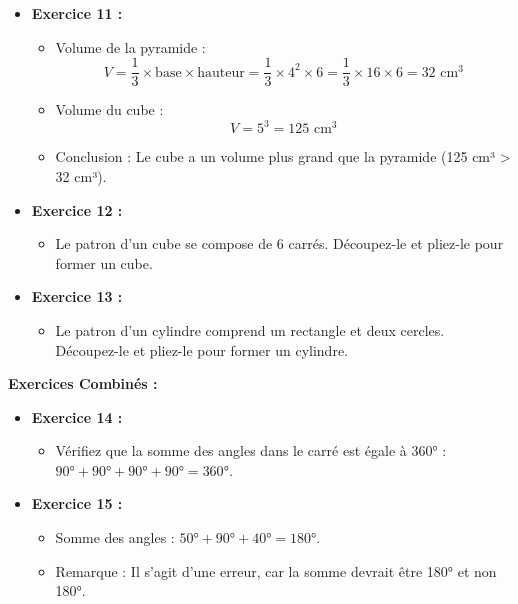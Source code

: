 \documentclass{article}
\begin{document}
\begin{tcolorbox}[colback=green!10!white, colframe=green!75!black, title=\textcolor{white}{Corrections }, sharp corners=south]

    \begin{itemize}
        \item \textbf{Exercice 11 :} 
            \begin{itemize}
                \item Volume de la pyramide : 
                    \[
                    V = \frac{1}{3} \times \text{base} \times \text{hauteur} = \frac{1}{3} \times 4^2 \times 6 = \frac{1}{3} \times 16 \times 6 = 32 \text{ cm}^3
                    \]
                \item Volume du cube : 
                    \[
                    V = 5^3 = 125 \text{ cm}^3
                    \]
                \item Conclusion : Le cube a un volume plus grand que la pyramide (125 cm³ > 32 cm³).
            \end{itemize}

        \item \textbf{Exercice 12 :} 
            \begin{itemize}
                \item Le patron d'un cube se compose de 6 carrés. Découpez-le et pliez-le pour former un cube.
            \end{itemize}

        \item \textbf{Exercice 13 :} 
            \begin{itemize}
                \item Le patron d'un cylindre comprend un rectangle et deux cercles. Découpez-le et pliez-le pour former un cylindre.
            \end{itemize}
    \end{itemize}

    \vspace{10pt}

    \textbf{Exercices Combinés :}

    \begin{itemize}
        \item \textbf{Exercice 14 :} 
            \begin{itemize}
                \item Vérifiez que la somme des angles dans le carré est égale à 360° : \(90° + 90° + 90° + 90° = 360°\).
            \end{itemize}

        \item \textbf{Exercice 15 :} 
            \begin{itemize}
                \item Somme des angles : \(50° + 90° + 40° = 180°\). 
                \item Remarque : Il s'agit d'une erreur, car la somme devrait être 180° et non 180°.
            \end{itemize}
    \end{itemize}

\end{tcolorbox}
\end{document}
